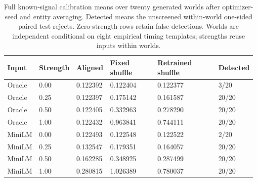 \begin{table}[htbp]
\centering\small
\setlength{\tabcolsep}{4pt}
\caption{Full known-signal calibration means over twenty generated worlds after optimizer-seed and entity averaging. Detected means the unscreened within-world one-sided paired test rejects. Zero-strength rows retain false detections. Worlds are independent conditional on eight empirical timing templates; strengths reuse inputs within worlds.}
\label{tab:calibration_full}
\begin{tabular}{llllll}
\toprule
Input & Strength & Aligned & Fixed shuffle & Retrained shuffle & Detected\\
\midrule
Oracle & 0.00 & 0.122392 & 0.122404 & 0.122377 & 3/20\\
Oracle & 0.25 & 0.122397 & 0.175142 & 0.161587 & 20/20\\
Oracle & 0.50 & 0.122405 & 0.332963 & 0.278290 & 20/20\\
Oracle & 1.00 & 0.122432 & 0.963841 & 0.744111 & 20/20\\
MiniLM & 0.00 & 0.122493 & 0.122548 & 0.122522 & 2/20\\
MiniLM & 0.25 & 0.132547 & 0.179351 & 0.164057 & 20/20\\
MiniLM & 0.50 & 0.162285 & 0.348925 & 0.287499 & 20/20\\
MiniLM & 1.00 & 0.280815 & 1.026389 & 0.780037 & 20/20\\
\bottomrule
\end{tabular}
\end{table}
